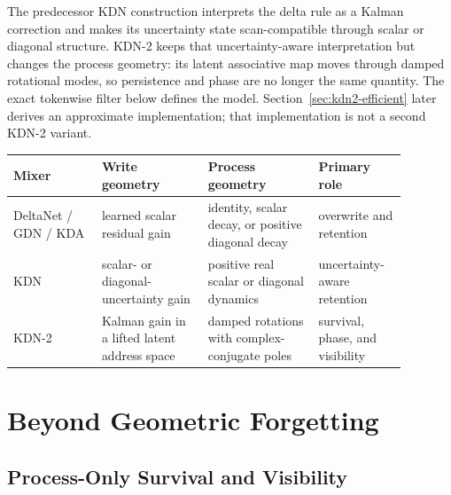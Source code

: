 \documentclass[11pt,letterpaper,logo]{yalearxiv}
\begin{document}
The predecessor KDN construction interprets the delta rule as a Kalman correction and makes its
uncertainty state scan-compatible through scalar or diagonal structure. KDN-2 keeps that
uncertainty-aware interpretation but changes the process geometry: its latent associative map moves
through damped rotational modes, so persistence and phase are no longer the same quantity. The
exact tokenwise filter below defines the model. Section~\ref{sec:kdn2-efficient} later derives an
approximate implementation; that implementation is not a second KDN-2 variant.

\begin{center}
\footnotesize
\begin{tabular}{p{0.20\linewidth}p{0.24\linewidth}p{0.25\linewidth}p{0.19\linewidth}}
\toprule
\textbf{Mixer} & \textbf{Write geometry} & \textbf{Process geometry} & \textbf{Primary role}\\
\midrule
DeltaNet / GDN / KDA & learned scalar residual gain & identity, scalar decay, or positive diagonal
decay & overwrite and retention\\
KDN & scalar- or diagonal-uncertainty gain & positive real scalar or diagonal dynamics &
uncertainty-aware retention\\
KDN-2 & Kalman gain in a lifted latent address space & damped rotations with complex-conjugate
poles & survival, phase, and visibility\\
\bottomrule
\end{tabular}
\end{center}


\section{Beyond Geometric Forgetting}
\label{sec:kdn2-geometry}

\subsection{Process-Only Survival and Visibility}
\label{sec:kdn2-process-lineage}
\end{document}
